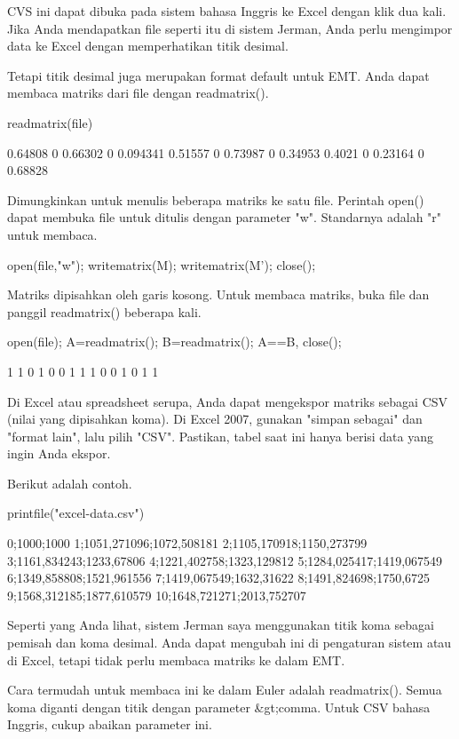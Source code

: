 \documentclass{article}
\begin{document}
CVS ini dapat dibuka pada sistem bahasa Inggris ke Excel dengan klik
dua kali. Jika Anda mendapatkan file seperti itu di sistem Jerman,
Anda perlu mengimpor data ke Excel dengan memperhatikan titik desimal.


Tetapi titik desimal juga merupakan format default untuk EMT. Anda
dapat membaca matriks dari file dengan readmatrix().


\>readmatrix(file)


      0.64808         0   0.66302         0  0.094341 
      0.51557         0   0.73987         0   0.34953 
       0.4021         0   0.23164         0   0.68828 

Dimungkinkan untuk menulis beberapa matriks ke satu file. Perintah
open() dapat membuka file untuk ditulis dengan parameter "w".
Standarnya adalah "r" untuk membaca.


\>open(file,"w"); writematrix(M); writematrix(M'); close();


Matriks dipisahkan oleh garis kosong. Untuk membaca matriks, buka file
dan panggil readmatrix() beberapa kali.


\>open(file); A=readmatrix(); B=readmatrix(); A==B, close();


            1         1         0         1         0 
            0         1         1         1         0 
            0         1         0         1         1 

Di Excel atau spreadsheet serupa, Anda dapat mengekspor matriks
sebagai CSV (nilai yang dipisahkan koma). Di Excel 2007, gunakan
"simpan sebagai" dan "format lain", lalu pilih "CSV". Pastikan, tabel
saat ini hanya berisi data yang ingin Anda ekspor.


Berikut adalah contoh.


\>printfile("excel-data.csv")


    0;1000;1000
    1;1051,271096;1072,508181
    2;1105,170918;1150,273799
    3;1161,834243;1233,67806
    4;1221,402758;1323,129812
    5;1284,025417;1419,067549
    6;1349,858808;1521,961556
    7;1419,067549;1632,31622
    8;1491,824698;1750,6725
    9;1568,312185;1877,610579
    10;1648,721271;2013,752707

Seperti yang Anda lihat, sistem Jerman saya menggunakan titik koma
sebagai pemisah dan koma desimal. Anda dapat mengubah ini di
pengaturan sistem atau di Excel, tetapi tidak perlu membaca matriks ke
dalam EMT.


Cara termudah untuk membaca ini ke dalam Euler adalah readmatrix().
Semua koma diganti dengan titik dengan parameter &gt;comma. Untuk CSV
bahasa Inggris, cukup abaikan parameter ini.
\end{document}
